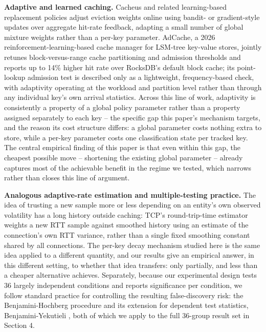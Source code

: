 \documentclass[11pt,letterpaper]{article}
\begin{document}
\textbf{Adaptive and learned caching.} Cacheus \citep{Rodriguez2021} and related learning-based replacement policies adjust eviction weights online using bandit- or gradient-style updates over aggregate hit-rate feedback, adapting a small number of global mixture weights rather than a per-key parameter. AdCache, a 2026 reinforcement-learning-based cache manager for LSM-tree key-value stores, jointly retunes block-versus-range cache partitioning and admission thresholds and reports up to 14\% higher hit rate over RocksDB's default block cache; its point-lookup admission test is described only as a lightweight, frequency-based check, with adaptivity operating at the workload and partition level rather than through any individual key's own arrival statistics. Across this line of work, adaptivity is consistently a property of a global policy parameter rather than a property assigned separately to each key -- the specific gap this paper's mechanism targets, and the reason its cost structure differs: a global parameter costs nothing extra to store, while a per-key parameter costs one classification state per tracked key. The central empirical finding of this paper is that even within this gap, the cheapest possible move -- shortening the existing global parameter -- already captures most of the achievable benefit in the regime we tested, which narrows rather than closes this line of argument.

\textbf{Analogous adaptive-rate estimation and multiple-testing practice.} The idea of trusting a new sample more or less depending on an entity's own observed volatility has a long history outside caching: TCP's round-trip-time estimator \citep{Jacobson1988} weights a new RTT sample against smoothed history using an estimate of the connection's own RTT variance, rather than a single fixed smoothing constant shared by all connections. The per-key decay mechanism studied here is the same idea applied to a different quantity, and our results give an empirical answer, in this different setting, to whether that idea transfers: only partially, and less than a cheaper alternative achieves. Separately, because our experimental design tests 36 largely independent conditions and reports significance per condition, we follow standard practice for controlling the resulting false-discovery risk: the Benjamini-Hochberg procedure \citep{Benjamini1995} and its extension for dependent test statistics, Benjamini-Yekutieli \citep{Benjamini2001}, both of which we apply to the full 36-group result set in Section 4.
\end{document}
